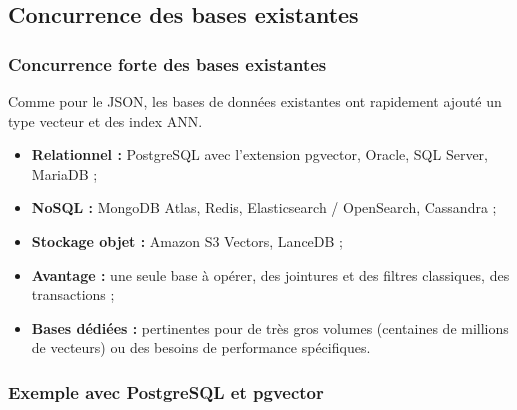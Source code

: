     \subsection{Concurrence des bases existantes}
    \begin{frame}
        \frametitle{Concurrence forte des bases existantes}

        \small
        Comme pour le JSON, les bases de données existantes ont rapidement ajouté un type vecteur et des index ANN.
        \vspace{5px}

        \begin{itemize}
            \small
            \item \textbf{Relationnel :} PostgreSQL avec l'extension pgvector, Oracle, SQL Server, MariaDB ;
            \item \textbf{NoSQL :} MongoDB Atlas, Redis, Elasticsearch / OpenSearch, Cassandra ;
            \item \textbf{Stockage objet :} Amazon S3 Vectors, LanceDB ;
            \item \textbf{Avantage :} une seule base à opérer, des jointures et des filtres classiques, des transactions ;
            \item \textbf{Bases dédiées :} pertinentes pour de très gros volumes (centaines de millions de vecteurs) ou des besoins de performance spécifiques.
        \end{itemize}
    \end{frame}

    \begin{frame}
        \frametitle{Exemple avec PostgreSQL et pgvector}

        \begin{listing}[H]
            \inputminted[fontsize=\scriptsize, linenos=true]{sql}{code/requetePgvector.sql}
            \caption{Recherche sémantique avec pgvector.}
        \end{listing}
    \end{frame}
